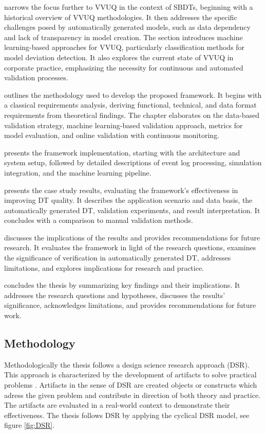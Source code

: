  narrows the focus further to VVUQ in the context of SBDTs, beginning with a historical overview of VVUQ methodologies. It then addresses the specific challenges posed by automatically generated models, such as data dependency and lack of transparency in model creation. The section introduces machine learning-based approaches for VVUQ, particularly classification methods for model deviation detection. It also explores the current state of VVUQ in corporate practice, emphasizing the necessity for continuous and automated validation processes.

 outlines the methodology used to develop the proposed framework. It begins with a classical requirements analysis, deriving functional, technical, and data format requirements from theoretical findings. The chapter elaborates on the data-based validation strategy, machine learning-based validation approach, metrics for model evaluation, and online validation with continuous monitoring.

 presents the framework implementation, starting with the architecture and system setup, followed by detailed descriptions of event log processing, simulation integration, and the machine learning pipeline.

 presents the case study results, evaluating the framework's effectiveness in improving DT quality. It describes the application scenario and data basis, the automatically generated DT, validation experiments, and result interpretation. It concludes with a comparison to manual validation methods.

 discusses the implications of the results and provides recommendations for future research. It evaluates the framework in light of the research questions, examines the significance of verification in automatically generated DT, addresses limitations, and explores implications for research and practice.

 concludes the thesis by summarizing key findings and their implications. It addresses the research questions and hypotheses, discusses the results' significance, acknowledges limitations, and provides recommendations for future work.

\subsection*{Methodology}

Methodologically the thesis follows a design science research approach (DSR). This approach is characterized by the development of artifacts to solve practical problems \parencite{hevner2004design,peffers2007design}. Artifacts in the sense of DSR are created objects or constructs which adress the given problem and contribute in direction of both theory and practice. The artifacts are evaluated in a real-world context to demonstrate their effectiveness. The thesis follows DSR by applying the cyclical DSR model, see figure \ref{fig:DSR}.

